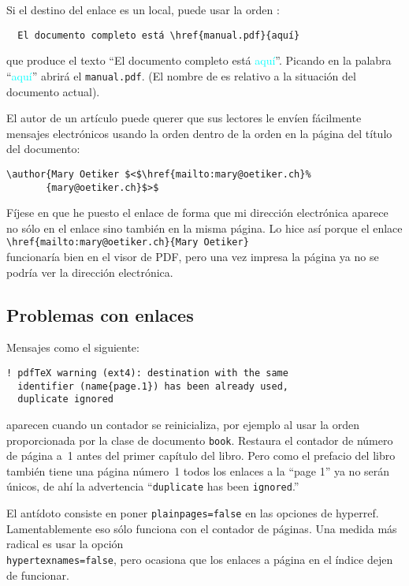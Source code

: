 Si el destino del enlace es un \filenomo{} local, puede usar la orden : 
\begin{verbatim}
  El documento completo está \href{manual.pdf}{aquí}
\end{verbatim}
que produce el texto ``El documento completo está \textcolor{cyan}{aquí}''. Picando en la palabra ``\textcolor{cyan}{aquí}'' abrirá el \filenomo{} \texttt{manual.pdf}. (El nombre de \filenomo{} es relativo a la situación del documento actual).

El autor de un artículo puede querer que sus lectores le envíen fácilmente mensajes electrónicos usando la orden  dentro de la orden  en la página del título del documento:
\begin{code}
\begin{verbatim}
\author{Mary Oetiker $<$\href{mailto:mary@oetiker.ch}%
       {mary@oetiker.ch}$>$
\end{verbatim}
\end{code}
Fíjese en que he puesto el enlace de forma que mi dirección electrónica aparece no sólo en el enlace sino también en la misma página.  Lo hice así porque el enlace\\ \verb+\href{mailto:mary@oetiker.ch}{Mary Oetiker}+\\ funcionaría bien en el visor de PDF, pero una vez impresa la página ya no se podría ver la dirección electrónica.

\subsection{Problemas con enlaces}

Mensajes como el siguiente:
\begin{verbatim}
! pdfTeX warning (ext4): destination with the same
  identifier (name{page.1}) has been already used,
  duplicate ignored
\end{verbatim}
aparecen cuando un contador se reinicializa, por ejemplo al usar la orden  proporcionada por la clase de documento \texttt{book}.  Restaura el contador de número de página a~1 antes del primer capítulo del libro.  Pero como el prefacio del libro también tiene una página número~1 todos los enlaces a la ``page 1'' ya no serán únicos, de ahí la advertencia ``\verb+duplicate+ has been \verb+ignored+.''

El antídoto consiste en poner \texttt{plainpages=false} en las opciones de hyperref.  Lamentablemente eso sólo funciona con el contador de páginas.  Una medida más radical es usar la opción\\ \texttt{hypertexnames=false}, pero ocasiona que los enlaces a página en el índice dejen de funcionar.


